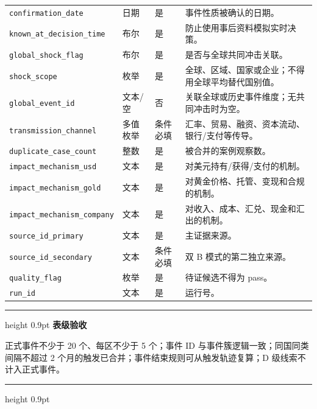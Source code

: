 \documentclass[UTF8,fontset=windows,12pt,openany]{ctexbook}
\newenvironment{gatebox}[1][]{%
  \par\medskip\noindent\begin{center}\begin{minipage}{0.93\textwidth}%
  \color{GoldLine}\hrule height 0.9pt\vspace{0.45em}%
  \textbf{#1}\par\smallskip\color{black}%
}{%
  \par\vspace{0.35em}\color{GoldLine}\hrule height 0.9pt%
  \end{minipage}\end{center}\medskip%
}
\newcommand{\Field}[1]{{\small\nolinkurl{#1}}}
\begin{document}
\begin{longtable}{p{3.6cm}p{2.3cm}p{2.1cm}p{5.2cm}}
\Field{confirmation_date} & 日期 & 是 & 事件性质被确认的日期。\\
\Field{known_at_decision_time} & 布尔 & 是 & 防止使用事后资料模拟实时决策。\\
\Field{global_shock_flag} & 布尔 & 是 & 是否与全球共同冲击关联。\\
\Field{shock_scope} & 枚举 & 是 & 全球、区域、国家或企业；不得用全球平均替代国别值。\\
\Field{global_event_id} & 文本/空 & 否 & 关联全球或历史事件维度；无共同冲击时为空。\\
\Field{transmission_channel} & 多值枚举 & 条件必填 & 汇率、贸易、融资、资本流动、银行/支付等传导。\\
\Field{duplicate_case_count} & 整数 & 是 & 被合并的案例观察数。\\
\Field{impact_mechanism_usd} & 文本 & 是 & 对美元持有/获得/支付的机制。\\
\Field{impact_mechanism_gold} & 文本 & 是 & 对黄金价格、托管、变现和合规的机制。\\
\Field{impact_mechanism_company} & 文本 & 是 & 对收入、成本、汇兑、现金和汇出的机制。\\
\Field{source_id_primary} & 文本 & 是 & 主证据来源。\\
\Field{source_id_secondary} & 文本 & 条件必填 & 双 B 模式的第二独立来源。\\
\Field{quality_flag} & 枚举 & 是 & 待证候选不得为 pass。\\
\Field{run_id} & 文本 & 是 & 运行号。\\
\bottomrule
\end{longtable}

\begin{gatebox}[表级验收]
正式事件不少于 20 个、每区不少于 5 个；事件 ID 与事件簇逻辑一致；同国同类间隔不超过 2 个月的触发已合并；事件结束规则可从触发轨迹复算；D 级线索不计入正式事件。
\end{gatebox}
\end{document}
